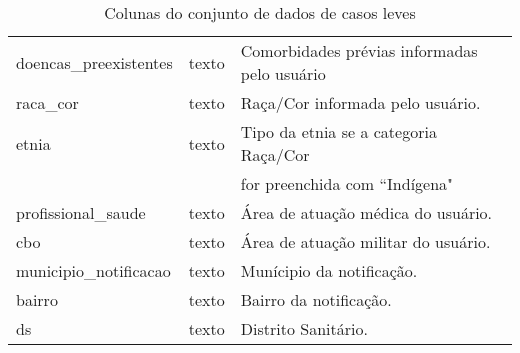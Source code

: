 \begin{table}[H]
\begin{tabular}{lll}
  doencas\_preexistentes                & texto                               & Comorbidades prévias informadas pelo usuário                                                                                                        \\
  raca\_cor                             & texto                               & Raça/Cor informada pelo usuário.                                                                                                                                \\
  etnia                                 & texto                               & Tipo da etnia se a categoria Raça/Cor \\ & & for preenchida com “Indígena"                                                                                             \\
  profissional\_saude                   & texto                               & Área de atuação médica do usuário.                                                                                                                              \\
  cbo                                   & texto                               & Área de atuação militar do usuário.                                                                                                                             \\
  municipio\_notificacao                & texto                               & Munícipio da notificação.                                                                                                                                       \\
  bairro                                & texto                               & Bairro da notificação.                                                                                                                                          \\
  ds                                    & texto                               & Distrito Sanitário.                                                                                                                                            
\end{tabular}
\caption{Colunas do conjunto de dados de casos leves}
\label{tbl:tabela-casosleves}  
\end{table}
